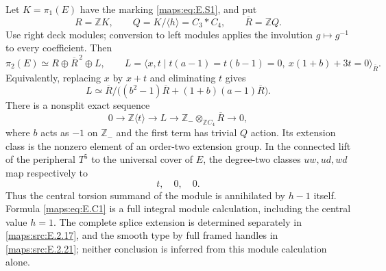 \begin{theorem}\label{maps:src:E.2.16}


Let $K=\pi_1(E)$ have the marking \eqref{maps:eq:E.S1}, and put
\[
 R=\mathbb ZK,\qquad Q=K/\langle h\rangle=C_3*C_4,
 \qquad \overline R=\mathbb ZQ.
\]
Use right deck modules; conversion to left modules applies the
involution $g\mapsto g^{-1}$ to every coefficient. Then
\[
 \pi_2(E)\simeq R\oplus\overline R^{\,2}\oplus L,
 \qquad
 L=\langle x,t\mid t(a-1)=t(b-1)=0,
                         \ x(1+b)+3t=0\rangle_{\overline R}.
 \tag{E.C1}\label{maps:eq:E.C1}
\]
Equivalently, replacing $x$ by $x+t$ and eliminating $t$ gives
\[
 L\simeq\overline R\big/
       \big((b^2-1)\overline R+(1+b)(a-1)\overline R\big).
 \tag{E.C2}\label{maps:eq:E.C2}
\]
There is a nonsplit exact sequence
\[
 0\longrightarrow\mathbb Z\langle t\rangle
  \longrightarrow L\longrightarrow
  \mathbb Z_{-}\otimes_{\mathbb ZC_4}\overline R
  \longrightarrow0,
 \tag{E.C3}\label{maps:eq:E.C3}
\]
where $b$ acts as $-1$ on $\mathbb Z_{-}$ and the first term
has trivial $Q$ action. Its extension class is the nonzero
element of an order-two extension group. In the connected
lift of the peripheral $T^5$ to the universal cover of $E$,
the degree-two classes $uw,ud,wd$ map respectively to
\[
                           t,\quad0,\quad0.
 \tag{E.C4}\label{maps:eq:E.C4}
\]
Thus the central torsion summand of the module is annihilated
by $h-1$ itself. Formula \eqref{maps:eq:E.C1} is a full integral module
calculation, including the central value $h=1$.  The complete
splice extension is determined separately in \ref{maps:src:E.2.17}, and the
smooth type by full framed handles in \ref{maps:src:E.2.21}; neither conclusion
is inferred from this module calculation alone.


\end{theorem}
